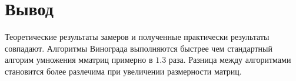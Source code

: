 \begin{center}
	\label{img:graph_sorted}
\end{center}
\newpage

\begin{center}
	\label{img:graph_sorted1}
\end{center}
\newpage


\section*{Вывод}


Теоретические результаты замеров и полученные практически результаты совпадают. Алгоритмы Винограда выполняются быстрее чем стандартный алгорим умножения мматриц примерно в $1.3$ раза.  Разница между алгоритмами становится более разлечима при увеличении размерности матриц.